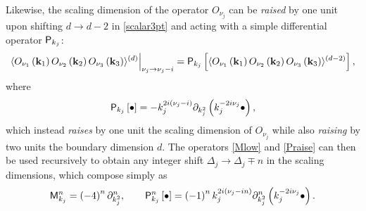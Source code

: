 \documentclass[11pt,a4paper]{article}
\begin{document}
Likewise, the scaling dimension of the operator $O_{\nu_j}$ can be \emph{raised} by one unit upon shifting $d \to d-2$ in \eqref{scalar3pt} and acting with a simple differential operator ${\sf P}_{k_j}$:
\begin{equation}\label{Praisecor}
   \langle O_{\nu_1}\left({\bf k}_1\right)O_{\nu_2}\left({\bf k}_2\right)O_{\nu_3}\left({\bf k}_3\right)  \rangle{}^{(d)}\Big|_{\nu_j \to \nu_j-i} =  {\sf P}_{k_j}\left[\langle O_{\nu_1}\left({\bf k}_1\right)O_{\nu_2}\left({\bf k}_2\right)O_{\nu_3}\left({\bf k}_3\right)  \rangle{}^{(d-2)} \right],
\end{equation}
where
\begin{equation}\label{Praise}
    {\sf P}_{k_j}\left[\bullet\right] = - k^{2i\left(\nu_j-i\right)}_j\partial_{k^2_j}\left(k^{-2i\nu_j}_j \bullet \right),
\end{equation}
which instead \emph{raises} by one unit the scaling dimension of $O_{\nu_j}$ while also \emph{raising} by two units the boundary dimension $d$. The operators \eqref{Mlow} and \eqref{Praise} can then be used recursively to obtain any integer shift $\Delta_j \to \Delta_j \mp n$ in the scaling dimensions, which compose simply as
\begin{equation}
   {\sf M}^n_{k_j} = \left(-4\right)^n \partial^n_{k^2_j}, \qquad {\sf P}^{n}_{k_j}\left[\bullet\right] = \left(-1\right)^n k^{2i\left(\nu_j-i n\right)}_j\partial^n_{k^2_j}\left(k^{-2i\nu_j}_j \bullet \right).
\end{equation}
\end{document}
